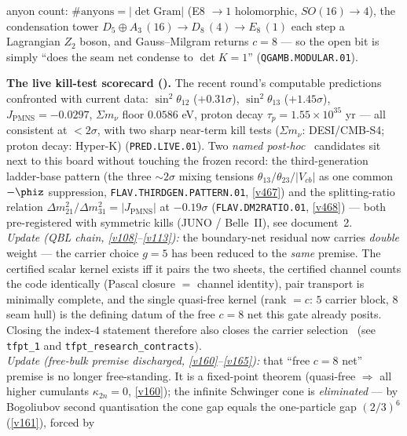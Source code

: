 anyon count: $\#\text{anyons}=|\det\mathrm{Gram}|$ (E8 $\to1$ holomorphic, $SO(16)\to4$), the
condensation tower $D_5{\oplus}A_3\,(16)\to D_8\,(4)\to E_8\,(1)$ each step a Lagrangian $Z_2$ boson, and
Gauss--Milgram returns $c{=}8$ --- so the open bit is simply ``does the seam net condense to $\det K{=}1$''
(\texttt{QGAMB.MODULAR.01}).
\par\smallskip\noindent\textbf{The live kill-test scorecard ().} The
recent round's computable predictions confronted with current data: $\sin^2\theta_{12}$ ($+0.31\sigma$),
$\sin^2\theta_{13}$ ($+1.45\sigma$), $J_{\mathrm{PMNS}}{=}{-}0.0297$, $\Sigma m_\nu$ floor $0.0586$ eV,
proton decay $\tau_p{=}1.55{\times}10^{35}$ yr --- all consistent at $<2\sigma$, with two sharp near-term kill
tests ($\Sigma m_\nu$: DESI/CMB-S4; proton decay: Hyper-K) (\texttt{PRED.LIVE.01}). Two \emph{named post-hoc}
\mO\ candidates sit next to this board without touching the frozen record: the third-generation ladder-base
pattern (the three ${\sim}2\sigma$ mixing tensions $\theta_{13}/\theta_{23}/|V_{cb}|$ as one common $-\phiz$
suppression, \texttt{FLAV.THIRDGEN.PATTERN.01}, \vref{v467}) and the splitting-ratio relation
$\Delta m^2_{21}/\Delta m^2_{31}=|J_{\mathrm{PMNS}}|$ at $-0.19\sigma$ (\texttt{FLAV.DM2RATIO.01}, \vref{v468})
--- both pre-registered with symmetric kills (JUNO / Belle~II), see document~2.
\smallskip\\
\noindent\emph{Update (QBL chain, \vref{v108}--\vref{v113}):} the boundary-net residual now carries \emph{double}
weight --- the carrier choice $g=5$ has been reduced to the \emph{same} premise. The certified scalar
kernel exists iff it pairs the two sheets, the certified channel counts the code identically (Pascal
closure $=$ channel identity), pair transport is minimally complete, and the single quasi-free kernel
(rank $=c$: $5$ carrier block, $8$ seam hull) is the defining datum of the free $c=8$ net this gate
already posits. Closing the index-$4$ statement therefore also closes the carrier selection \mE\
(see \texttt{tfpt\_1} and \texttt{tfpt\_research\_contracts}). 
\smallskip\\
\noindent\emph{Update (free-bulk premise discharged, \vref{v160}--\vref{v165}):} that ``free $c{=}8$ net''
premise is no longer free-standing. It is a fixed-point theorem (quasi-free $\Rightarrow$ all higher
cumulants $\kappa_{2n}{=}0$, \vref{v160}); the infinite Schwinger cone is \emph{eliminated} --- by
Bogoliubov second quantisation the cone gap equals the one-particle gap $(2/3)^6$ (\vref{v161}), forced by
